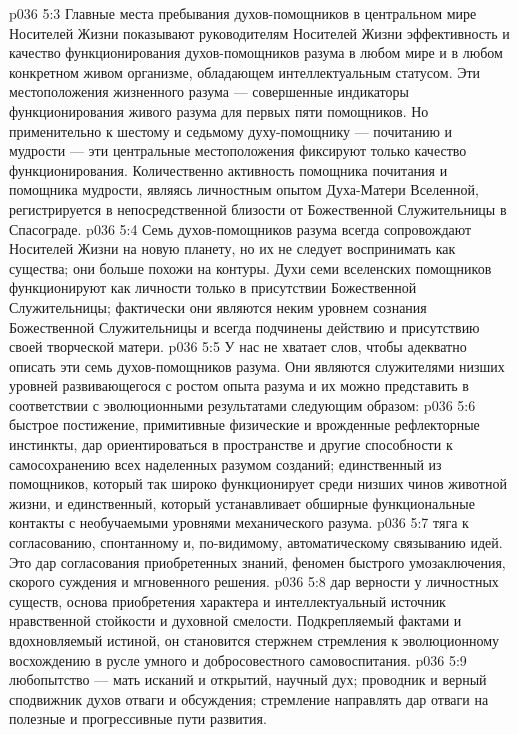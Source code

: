 \vs p036 5:3 Главные места пребывания духов\hyp{}помощников в центральном мире Носителей Жизни показывают руководителям Носителей Жизни эффективность и качество функционирования духов\hyp{}помощников разума в любом мире и в любом конкретном живом организме, обладающем интеллектуальным статусом. Эти местоположения жизненного разума --- совершенные индикаторы функционирования живого разума для первых пяти помощников. Но применительно к шестому и седьмому духу\hyp{}помощнику --- почитанию и мудрости --- эти центральные местоположения фиксируют только качество функционирования. Количественно активность помощника почитания и помощника мудрости, являясь личностным опытом Духа\hyp{}Матери Вселенной, регистрируется в непосредственной близости от Божественной Служительницы в Спасограде.
\vs p036 5:4 \pc Семь духов\hyp{}помощников разума всегда сопровождают Носителей Жизни на новую планету, но их не следует воспринимать как существа; они больше похожи на контуры. Духи семи вселенских помощников функционируют как личности только в присутствии Божественной Служительницы; фактически они являются неким уровнем сознания Божественной Служительницы и всегда подчинены действию и присутствию своей творческой матери.
\vs p036 5:5 У нас не хватает слов, чтобы адекватно описать эти семь духов\hyp{}помощников разума. Они являются служителями низших уровней развивающегося с ростом опыта разума и их можно представить в соответствии с эволюционными результатами следующим образом:
\vs p036 5:6 \bibnobreakspace {} быстрое постижение, примитивные физические и врожденные рефлекторные инстинкты, дар ориентироваться в пространстве и другие способности к самосохранению всех наделенных разумом созданий; единственный из помощников, который так широко функционирует среди низших чинов животной жизни, и единственный, который устанавливает обширные функциональные контакты с необучаемыми уровнями механического разума.
\vs p036 5:7 \bibnobreakspace {} тяга к согласованию, спонтанному и, по\hyp{}видимому, автоматическому связыванию идей. Это дар согласования приобретенных знаний, феномен быстрого умозаключения, скорого суждения и мгновенного решения.
\vs p036 5:8 \bibnobreakspace {} дар верности у личностных существ, основа приобретения характера и интеллектуальный источник нравственной стойкости и духовной смелости. Подкрепляемый фактами и вдохновляемый истиной, он становится стержнем стремления к эволюционному восхождению в русле умного и добросовестного самовоспитания.
\vs p036 5:9 \bibnobreakspace {} любопытство --- мать исканий и открытий, научный дух; проводник и верный сподвижник духов отваги и обсуждения; стремление направлять дар отваги на полезные и прогрессивные пути развития.
